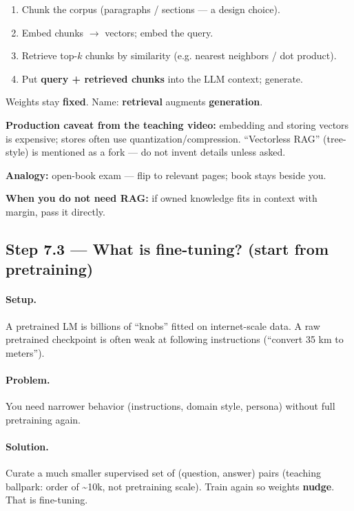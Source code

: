 \documentclass[11pt,a4paper]{article}
\begin{document}
\begin{enumerate}
\item Chunk the corpus (paragraphs / sections --- a design choice).  
\item Embed chunks $\rightarrow$ vectors; embed the query.  
\item Retrieve top-\(k\) chunks by similarity (e.g. nearest neighbors / dot product).  
\item Put \textbf{query + retrieved chunks} into the LLM context; generate.
\end{enumerate}


Weights stay \textbf{fixed}. Name: \textbf{retrieval} augments \textbf{generation}.


\textbf{Production caveat from the teaching video:} embedding and storing vectors is expensive; stores often use quantization/compression. ``Vectorless RAG'' (tree-style) is mentioned as a fork --- do not invent details unless asked.


\textbf{Analogy:} open-book exam --- flip to relevant pages; book stays beside you.


\textbf{When you do not need RAG:} if owned knowledge fits in context with margin, pass it directly.


\subsection{Step 7.3 --- What is fine-tuning? (start from pretraining)}


\paragraph{Setup.}

A pretrained LM is billions of ``knobs'' fitted on internet-scale data. A raw pretrained checkpoint is often weak at following instructions (``convert 35 km to meters'').


\paragraph{Problem.}

You need narrower behavior (instructions, domain style, persona) without full pretraining again.


\paragraph{Solution.}

Curate a much smaller supervised set of (question, answer) pairs (teaching ballpark: order of \textasciitilde{}10k, not pretraining scale). Train again so weights \textbf{nudge}. That is fine-tuning.
\end{document}
